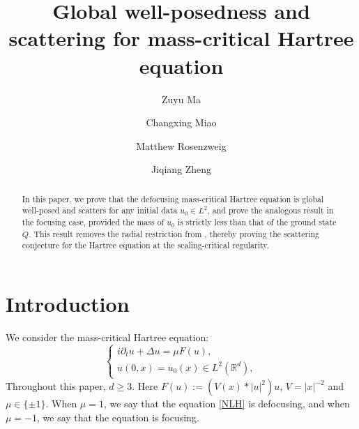 \documentclass[reqno,11pt]{amsart}
\theoremstyle{plain}
\theoremstyle{definition}
\numberwithin{equation}{section}
\numberwithin{theorem}{section}
\def\geq{\geqslant}
\def\R{\mathbb{R}}
\begin{document}
\title[GWP and scattering for mass-critical Hartree equation]{Global well-posedness and scattering for mass-critical Hartree equation}

\author[Z. Ma]{Zuyu Ma}
\address{Zuyu Ma, Graduate School of China Academy of Engineering Physics, Beijing 100088, China}

\author[C. Miao]{Changxing Miao}
\address{School of Mathematics and Physics, University of Science and Technology Beijing, Beijing 100083, China}

\author[M. Rosenzweig]{Matthew Rosenzweig}
\address{Matthew Rosenzweig, Department of Mathematical Sciences, Carnegie Mellon University, Pittsburgh, PA, USA}

\author[J. Zheng]{Jiqiang Zheng}
\address{Jiqiang Zheng, Institute of Applied Physics and Computational Mathematics and National Key Laboratory of Computational Physics, Beijing 100088, China}

\maketitle 
\begin{abstract}
In this paper, we prove that the defocusing mass-critical Hartree equation is global well-posed and scatters for any initial data $u_0\in L^2$, and prove the analogous result in the focusing case, provided the mass of $u_0$ is strictly less than that of the ground state $Q$. This result removes the radial restriction from \cite{MXZ-JMPA}, thereby proving the scattering conjecture for the Hartree equation at the scaling-critical regularity. 
\end{abstract}





\section{Introduction}
We consider the mass-critical Hartree equation:
\begin{equation}\label{NLH}
\begin{cases}
i\partial_{t}u+\Delta u=\mu F(u),\\
u(0,x)=u_{0}(x)\in L^2(\R^{d}),
\end{cases}
\end{equation}
Throughout this paper, $d\geq3$. Here $F(u):=(V(x)\ast|u|^2)u$, $V=|x|^{-2}$ and $\mu\in\{\pm1\}$. When $\mu=1$, we say that the equation \eqref{NLH} is defocusing, and when $\mu=-1$, we say that the equation is focusing.
\end{document}
